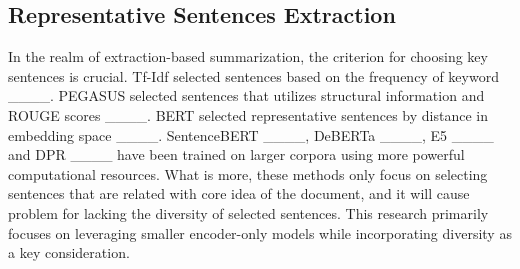 \subsection{Representative Sentences Extraction}
In the realm of extraction-based summarization, the criterion for choosing key sentences is crucial. Tf-Idf selected sentences based on the frequency of keyword ____. PEGASUS selected sentences that utilizes structural information and ROUGE scores ____. BERT selected representative sentences by distance in embedding space ____. SentenceBERT ____, DeBERTa ____, E5 ____ and DPR ____ have been trained on larger corpora using more powerful computational resources. What is more, these methods only focus on selecting sentences that are related with core idea of the document, and it will cause problem for lacking the diversity of selected sentences. This research primarily focuses on leveraging smaller encoder-only models while incorporating diversity as a key consideration.